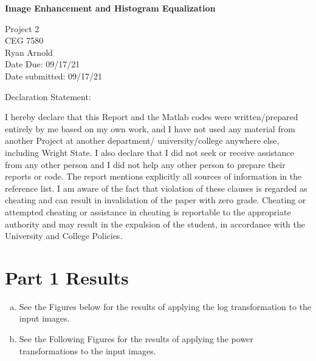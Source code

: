 \documentclass[./rarnold_report2.tex]{subfiles}
\begin{document}


\begin{titlepage}
\begin{Large}
\begin{center} 
\textbf{Image Enhancement and Histogram Equalization} \\
\end{center}
\end{Large}
Project 2\\
CEG 7580\\
Ryan Arnold \\
Date Due: 09/17/21 \\
Date submitted: 09/17/21
\vspace{24pt}

\noindent Declaration Statement: 

\noindent I hereby declare that this Report and the Matlab codes were written/prepared entirely by me based on my own work, and I have not used any material from another Project at another department/ university/college anywhere else, including Wright State. I also declare that I did not seek or receive assistance from any other person and I did not help any other person to prepare their reports or code.  The report mentions explicitly all sources of information in the reference list. I am aware of the fact that violation of these clauses is regarded as cheating and can result in invalidation of the paper with zero grade. Cheating or attempted cheating or assistance in cheating is reportable to the appropriate authority and may result in the expulsion of the student, in accordance with the University and College Policies.

\end{titlepage}

\clearpage

\section*{Part 1 Results}

\begin{enumerate}[a.]
  \item See the Figures below for the results of applying the log transformation to the input images. 
  
  \item See the Following Figures for the results of applying the power transformations to the input images.

\end{enumerate}
\end{document}
